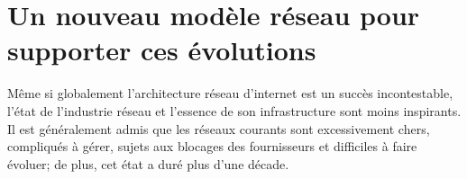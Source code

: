 \section{Un nouveau modèle réseau pour supporter ces évolutions}


Même si globalement l'architecture réseau d'internet est un succès incontestable, l'état de l'industrie réseau et l'essence de son infrastructure sont moins inspirants. Il est généralement admis que les réseaux courants sont excessivement chers, compliqués à gérer, sujets aux blocages des fournisseurs et difficiles à faire évoluer; de plus, cet état a duré plus d'une décade. \cite{fabricIntro}




